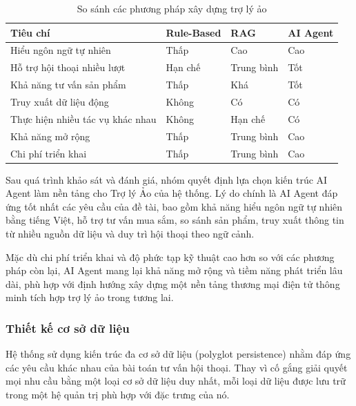 \begin{table}[H]
\centering
\renewcommand{\arraystretch}{1.3}
\begin{tabular}{|p{5cm}|p{2.5cm}|p{2.5cm}|p{2.5cm}|}
\hline
\textbf{Tiêu chí} & \textbf{Rule-Based} & \textbf{RAG} & \textbf{AI Agent} \\
\hline
Hiểu ngôn ngữ tự nhiên & Thấp & Cao & Cao \\
\hline
Hỗ trợ hội thoại nhiều lượt & Hạn chế & Trung bình & Tốt \\
\hline
Khả năng tư vấn sản phẩm & Thấp & Khá & Tốt \\
\hline
Truy xuất dữ liệu động & Không & Có & Có \\
\hline
Thực hiện nhiều tác vụ khác nhau & Không & Hạn chế & Có \\
\hline
Khả năng mở rộng & Thấp & Trung bình & Cao \\
\hline
Chi phí triển khai & Thấp & Trung bình & Cao \\
\hline
\end{tabular}
\caption{So sánh các phương pháp xây dựng trợ lý ảo}
\label{tab:assistant-approach-comparison}
\end{table}

Sau quá trình khảo sát và đánh giá, nhóm quyết định lựa chọn kiến trúc AI Agent làm nền tảng cho Trợ lý Ảo của hệ thống. Lý do chính là AI Agent đáp ứng tốt nhất các yêu cầu của đề tài, bao gồm khả năng hiểu ngôn ngữ tự nhiên bằng tiếng Việt, hỗ trợ tư vấn mua sắm, so sánh sản phẩm, truy xuất thông tin từ nhiều nguồn dữ liệu và duy trì hội thoại theo ngữ cảnh.

Mặc dù chi phí triển khai và độ phức tạp kỹ thuật cao hơn so với các phương pháp còn lại, AI Agent mang lại khả năng mở rộng và tiềm năng phát triển lâu dài, phù hợp với định hướng xây dựng một nền tảng thương mại điện tử thông minh tích hợp trợ lý ảo trong tương lai.










\subsubsection{Thiết kế cơ sở dữ liệu}

Hệ thống sử dụng kiến trúc đa cơ sở dữ liệu (polyglot persistence) nhằm đáp ứng các yêu cầu khác nhau của bài toán tư vấn hội thoại. Thay vì cố gắng giải quyết mọi nhu cầu bằng một loại cơ sở dữ liệu duy nhất, mỗi loại dữ liệu được lưu trữ trong một hệ quản trị phù hợp với đặc trưng của nó.

